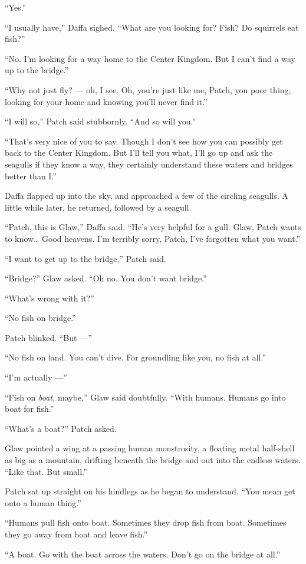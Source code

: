 \documentclass[12pt]{memoir}
\begin{document}
“Yes.”

“I usually have,” Daffa sighed. “What are you looking for? Fish? Do
squirrels eat fish?”

“No. I’m looking for a way home to the Center Kingdom. But I can’t
find a way up to the bridge.”

“Why not just fly? — oh, I see. Oh, you’re just like me, Patch, you
poor thing, looking for your home and knowing you’ll never find it.”

“I will so,” Patch said stubbornly. “And so will you.”

“That’s very nice of you to say. Though I don’t see how you can
possibly get back to the Center Kingdom. But I’ll tell you what, I’ll
go up and ask the seagulls if they know a way, they certainly
understand these waters and bridges better than I.”

Daffa flapped up into the sky, and approached a few of the circling
seagulls. A little while later, he returned, followed by a seagull.

“Patch, this is Glaw,” Daffa said. “He’s very helpful for a
gull. Glaw, Patch wants to know… Good heavens. I’m terribly sorry,
Patch, I’ve forgotten what you want.”

“I want to get up to the bridge,” Patch said.

“Bridge?” Glaw asked. “Oh no. You don’t want bridge.”

“What’s wrong with it?”

“No fish on bridge.”

Patch blinked. “But —”

“No fish on land. You can’t dive. For groundling like you, no fish at
all.”

“I’m actually —”

“Fish on \textit{boat,} maybe,” Glaw said doubtfully. “With
humans. Humans go into boat for fish.”

“What’s a boat?” Patch asked.

Glaw pointed a wing at a passing human monstrosity, a floating metal
half-shell as big as a mountain, drifting beneath the bridge and out
into the endless waters. “Like that. But small.”

Patch sat up straight on his hindlegs as he began to understand. “You
mean get onto a human thing.”

“Humans pull fish onto boat. Sometimes they drop fish from
boat. Sometimes they go away from boat and leave fish.”

“A boat. Go with the boat across the waters. Don’t go on the bridge at
all.”
\end{document}
